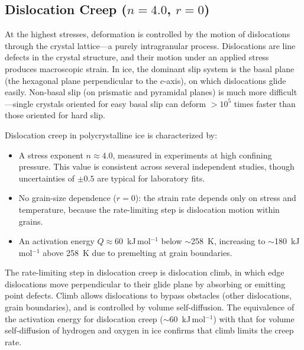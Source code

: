 \documentclass[11pt]{article}
\begin{document}

\subsection{Dislocation Creep ($n = 4.0$, $r = 0$)}
\label{sec:dislocation}

At the highest stresses, deformation is controlled by the motion of dislocations through the crystal lattice---a purely intragranular process.  Dislocations are line defects in the crystal structure, and their motion under an applied stress produces macroscopic strain.  In ice, the dominant slip system is the basal plane (the hexagonal plane perpendicular to the $c$-axis), on which dislocations glide easily.  Non-basal slip (on prismatic and pyramidal planes) is much more difficult---single crystals oriented for easy basal slip can deform $>10^5$ times faster than those oriented for hard slip.

\medskip
\noindent Dislocation creep in polycrystalline ice is characterized by:
\begin{itemize}
  \item A stress exponent $n \approx 4.0$, measured in experiments at high confining pressure.  This value is consistent across several independent studies, though uncertainties of $\pm 0.5$ are typical for laboratory fits.
  \item No grain-size dependence ($r = 0$): the strain rate depends only on stress and temperature, because the rate-limiting step is dislocation motion within grains.
  \item An activation energy $Q \approx 60$~kJ\,mol$^{-1}$ below $\sim$258~K, increasing to $\sim$180~kJ\,mol$^{-1}$ above 258~K due to premelting at grain boundaries.
\end{itemize}

\noindent The rate-limiting step in dislocation creep is dislocation climb, in which edge dislocations move perpendicular to their glide plane by absorbing or emitting point defects.  Climb allows dislocations to bypass obstacles (other dislocations, grain boundaries), and is controlled by volume self-diffusion.  The equivalence of the activation energy for dislocation creep ($\sim$60~kJ\,mol$^{-1}$) with that for volume self-diffusion of hydrogen and oxygen in ice confirms that climb limits the creep rate.
\end{document}
